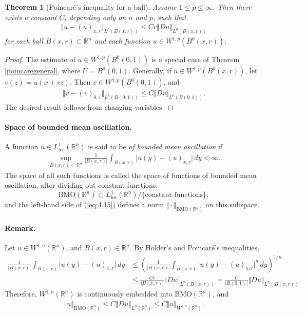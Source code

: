 \documentclass{article}
\numberwithin{equation}{section}
\newcommand{\bbR}{\mathbb{R}}
\newcommand{\loc}{\mathrm{loc}}
\theoremstyle{plain}
\newtheorem{theorem}{Theorem}[section]
\theoremstyle{definition}
\begin{document}
\begin{theorem}[Poincaré's inequality for a ball]\label{poincareball}
Assume $1\leq p\leq\infty$. Then there exists a constant $C$, depending only on $n$ and $p$, such that
\begin{align*}
	\Vert u-(u)_{x,r}\Vert_{L^p(B(x,r))}\leq Cr\Vert Du\Vert_{L^p(B(x,r))}
\end{align*}
for each ball $B(x,r)\subset\bbR^n$ and each function $u\in W^{1,p}(B^0(x,r))$.
\end{theorem}
\begin{proof}
The estimate of $u\in W^{1,p}(B^0(0,1))$ is a special case of Theorem \ref{poincaregeneral}, where $U=B^0(0,1)$. Generally, if $u\in W^{1,p}(B^0(x,r))$, let $v(z)=u(x+rz)$. Then $v\in W^{1,p}(B^0(0,1))$, and
\begin{align*}
	\Vert v-(v)_{0,1}\Vert_{L^p(B(0,1))}\leq C\Vert Dv\Vert_{L^p(B(0,1))}.
\end{align*}
The desired result follows from changing variables.
\end{proof}

\paragraph{Space of bounded mean oscillation.} A function $u\in L^1_\loc(\bbR^n)$ is said to be \textit{of bounded mean oscillation} if
\begin{align}
	\sup_{B(x,r)\subset\bbR^n}\frac{1}{\vert B(x,r)\vert}\int_{B(x,r)}\vert u(y)-(u)_{x,r}\vert\,dy<\infty.\label{eq:4.15}
\end{align}
The space of all such functions is called the space of functions of bounded mean oscillation, after dividing out constant functions:
$$\mathrm{BMO}(\bbR^n)\subset L^1_\loc(\bbR^n)/\{\text{constant functions}\},$$ 
and the left-hand side of (\ref{eq:4.15}) defines a norm $\Vert\cdot\Vert_{\mathrm{BMO}(\bbR^n)}$ on this subspace.

\paragraph{Remark.} Let $u\in W^{1,n}(\bbR^n)$, and $B(x,r)\in\bbR^n$. By Hölder's and Poincaré's inequalities,
\begin{align*}
	\frac{1}{\vert B(x,r)\vert}\int_{B(x,r)}\vert u(y)-(u)_{x,r}\vert\,dy&\leq\left(\frac{1}{\vert B(x,r)\vert}\int_{B(x,r)}\vert u(y)-(u)_{x,r}\vert^n\,dy\right)^{1/n}\\
	&\leq\frac{Cr}{\vert B(x,r)\vert}\Vert Du\Vert_{L^n(B(x,r))}=\frac{C}{\vert B(0,1)\vert}\Vert Du\Vert_{L^n(B(x,r))}.
\end{align*}
Therefore, $W^{1,n}(\bbR^n)$ is continuously embedded into $\mathrm{BMO}(\bbR^n)$, and
\begin{align*}
	\Vert u\Vert_{\mathrm{BMO}(\bbR^n)}\leq C\Vert Du\Vert_{L^n(\bbR^n)}\leq C\Vert u\Vert_{W^{1,n}(\bbR^n)}.
\end{align*}
\end{document}
